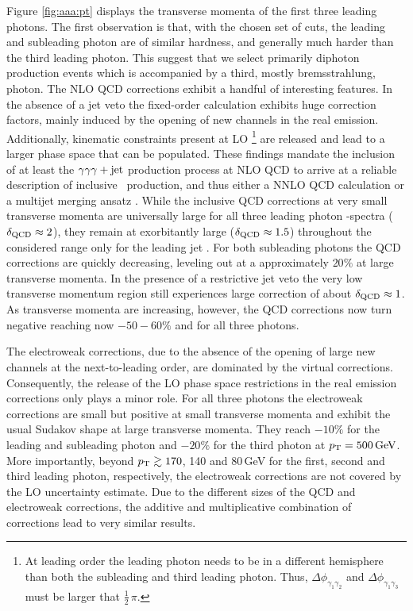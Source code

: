 Figure \ref{fig:aaa:pt} displays the transverse momenta of the 
first three leading photons. 
The first observation is that, with the chosen set of cuts, 
the leading and subleading photon are of similar hardness, 
and generally much harder than the third leading photon. 
This suggest that we select primarily diphoton production events 
which is accompanied by a third, mostly bremsstrahlung, photon. 
The NLO QCD corrections exhibit a handful of interesting features. 
In the absence of a jet veto the fixed-order calculation 
exhibits huge correction factors, mainly induced by the 
opening of new channels in the real emission. 
Additionally, kinematic constraints present at LO \footnote{
  At leading order the leading photon needs to be in a different 
  hemisphere than both the subleading and third leading photon. 
  Thus, $\Delta\phi_{\gamma_1\gamma_2}$ and $\Delta\phi_{\gamma_1\gamma_3}$ 
  must be larger that $\tfrac{1}{2}\,\pi$.
} are released and 
lead to a larger phase space that can be populated. 
These findings mandate the inclusion of at least the $\gamma\gamma\gamma+\text{jet}$ 
production process at NLO QCD to arrive at a reliable description 
of inclusive \aaa\ production, and thus either a NNLO QCD calculation 
or a multijet merging ansatz \cite{Hoeche:2012yf,Kallweit:2015dum}. 
While the inclusive QCD corrections at very small transverse momenta 
are universally large for all three leading photon \pT-spectra 
($\delta_\text{QCD}\approx 2$), they remain at exorbitantly large 
($\delta_\text{QCD}\approx 1.5$) throughout the considered range 
only for the leading jet \pT. 
For both subleading photons the QCD corrections are quickly 
decreasing, leveling out at a approximately $20\%$ at large transverse 
momenta.
In the presence of a restrictive jet veto the very low transverse 
momentum region still experiences large correction of about 
$\delta_\text{QCD}\approx 1$. 
As transverse momenta are increasing, however, the QCD corrections now turn 
negative reaching now $-50-60\%$ and for all three photons. 

The electroweak corrections, due to the absence of the opening 
of large new channels at the next-to-leading order, are dominated 
by the virtual corrections. 
Consequently, the release of the LO phase space restrictions 
in the real emission corrections only plays a minor role.
For all three photons the electroweak corrections are small but 
positive at small transverse momenta and exhibit the usual 
Sudakov shape at large transverse momenta.
They reach $-10\%$ for the leading and subleading photon and 
$-20\%$ for the third photon at $p_\text{T}=500\,\text{GeV}$. 
More importantly, beyond $p_\text{T}\gtrsim 170$, 140 and 80\,GeV 
for the first, second and third leading photon, respectively, 
the electroweak corrections are not covered by the LO 
uncertainty estimate.
Due to the different sizes of the QCD and electroweak 
corrections, the additive and multiplicative combination 
of corrections lead to very similar results.

